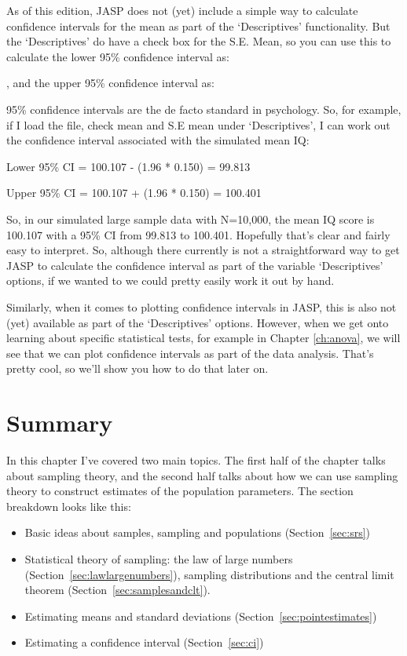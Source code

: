 As of this edition, JASP does not (yet) include a simple way to calculate confidence intervals for the mean as part of the `Descriptives' functionality. But the `Descriptives' do have a check box for the S.E. Mean, so you can use this to calculate the lower 95\% confidence interval as:

 , and the upper 95\% confidence interval as:


95\% confidence intervals are the de facto standard in psychology. So, for example, if I load the  file, check mean and S.E mean under `Descriptives', I can work out the confidence interval associated with the simulated mean IQ: 

Lower 95\% CI = 100.107 - (1.96 * 0.150) = 99.813

Upper 95\% CI = 100.107 + (1.96 * 0.150) = 100.401

So, in our simulated large sample data with N=10,000, the mean IQ score is 100.107 with a 95\% CI from 99.813 to 100.401. Hopefully that's clear and fairly easy to interpret. So, although there currently is not a straightforward way to get JASP to calculate the confidence interval as part of the variable `Descriptives' options, if we wanted to we could pretty easily work it out by hand. 

Similarly, when it comes to plotting confidence intervals in JASP, this is also not (yet) available as part of the `Descriptives' options. However, when we get onto learning about specific statistical tests, for example in Chapter  \ref{ch:anova}, we will see that we can plot confidence intervals as part of the data analysis. That's pretty cool, so we'll show you how to do that later on.


\section{Summary}

In this chapter I've covered two main topics. The first half of the chapter talks about sampling theory, and the second half talks about how we can use sampling theory to construct estimates of the population parameters. The section breakdown looks like this:

\begin{itemize} \itemsep -2pt
\item Basic ideas about samples, sampling and populations (Section~\ref{sec:srs})
\item Statistical theory of sampling: the law of large numbers (Section~\ref{sec:lawlargenumbers}), sampling distributions and the central limit theorem (Section~\ref{sec:samplesandclt}).
\item Estimating means and standard deviations (Section~\ref{sec:pointestimates})
\item Estimating a confidence interval (Section~\ref{sec:ci})
\end{itemize}


